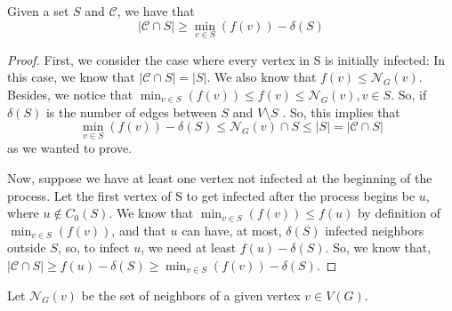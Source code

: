 \begin{myprop}
Given a set $S$ and $\mathcal{C}$,  %
we have that
\begin{equation}
|\mathcal{C} \cap S | \geq \min_{v \in S} (f(v)) - \delta (S)
\end{equation}
\end{myprop}
\begin{proof} 
First, we consider the case where every vertex in S is initially infected:
In this case, we know that $|\mathcal{C} \cap S | = |S|$. We also know that $f(v) \leq \mathcal{N}_G(v) $.  Besides, we notice that $\min_{v \in S} (f(v)) \leq f(v) \leq \mathcal{N}_G(v), v \in S$. So, if $ \delta(S)$ is the number of edges between $S$ and $V \setminus S$ . So, this implies that
\begin{equation}
\min_{v \in S} (f(v)) - \delta (S) \leq \mathcal{N}_G(v) \cap S  \leq |S| = |\mathcal{C} \cap S | 
\end{equation}
as we wanted to prove.

Now, suppose we have at least one vertex not infected at the beginning of the process. Let the first vertex of S %
to get infected after the process begins %
be $u$, where $u \notin C_0(S)$. We know that  $\min_{v \in S} (f(v)) \leq f(u)$ by definition of $\min_{v \in S} (f(v))$, and that $u$ can have, at most,  $\delta(S)$ infected neighbors outside $S$, so, to infect $u$, we need at least $f(u) -\delta(S)$. So, we know that, $|\mathcal{C} \cap S | \geq f(u) - \delta(S) \geq \min_{v \in S} (f(v)) - \delta(S) $.
\end{proof}

Let $\mathcal{N}_G(v)$ be the set of neighbors of a given vertex $v \in V(G)$.

